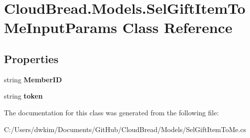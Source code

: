 \hypertarget{a00088}{}\section{Cloud\+Bread.\+Models.\+Sel\+Gift\+Item\+To\+Me\+Input\+Params Class Reference}
\label{a00088}
\subsection*{Properties}
\begin{DoxyCompactItemize}
\item 
string {\bfseries Member\+ID}\hypertarget{a00088_a26287699ce5150a86c765a1254823a02}{}\label{a00088_a26287699ce5150a86c765a1254823a02}

\item 
string {\bfseries token}\hypertarget{a00088_aa3997512709afcbb970f5990f3c3ef2b}{}\label{a00088_aa3997512709afcbb970f5990f3c3ef2b}

\end{DoxyCompactItemize}


The documentation for this class was generated from the following file\+:\begin{DoxyCompactItemize}
\item 
C\+:/\+Users/dwkim/\+Documents/\+Git\+Hub/\+Cloud\+Bread/\+Models/Sel\+Gift\+Item\+To\+Me.\+cs\end{DoxyCompactItemize}
